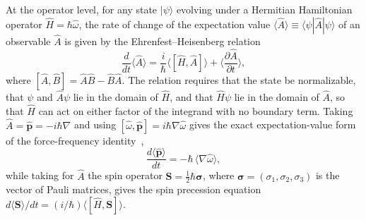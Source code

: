 \documentclass[aps,prd,onecolumn,tightenlines,nofootinbib,notitlepage,11pt,floatfix]{revtex4-2}
\theoremstyle{indentedtheorem}
\begin{document}
At the operator level, for any state $|\psi\rangle$ evolving under a Hermitian Hamiltonian operator $\hat{H} = \hbar\hat{\omega}$, the rate of change of the expectation value $\langle\hat{A}\rangle\equiv\langle\psi|\hat{A}|\psi\rangle$ of an observable $\hat{A}$ is given by the Ehrenfest--Heisenberg relation~\citep{Ehrenfest1927Bemerkung}
\begin{equation}
    \frac{d}{dt}\langle\hat{A}\rangle = \frac{i}{\hbar}\big\langle[\hat{H},\hat{A}]\big\rangle + \Big\langle\frac{\partial\hat{A}}{\partial t}\Big\rangle ,
    \label{eq:ehrenfest_commutator}
\end{equation}
where $[\hat{A},\hat{B}] = \hat{A}\hat{B} - \hat{B}\hat{A}$. The relation requires that the state be normalizable, that $\psi$ and $\hat{A}\psi$ lie in the domain of $\hat{H}$, and that $\hat{H}\psi$ lie in the domain of $\hat{A}$, so that $\hat{H}$ can act on either factor of the integrand with no boundary term. Taking $\hat{A} = \hat{\mathbf{p}} = -i\hbar\nabla$ and using $[\hat{\omega},\hat{\mathbf{p}}] = i\hbar\nabla\hat{\omega}$ gives the exact expectation-value form of the force-frequency identity~\citep{HutchisonSGM2026},
\begin{equation}
    \frac{d\langle\hat{\mathbf{p}}\rangle}{dt} = -\hbar\,\langle\nabla\hat{\omega}\rangle ,
    \label{eq:sgm_expectation}
\end{equation}
while taking for $\hat{A}$ the spin operator $\mathbf{S} = \tfrac{1}{2}\hbar\boldsymbol{\sigma}$, where $\boldsymbol{\sigma}=(\sigma_1,\sigma_2,\sigma_3)$ is the vector of Pauli matrices, gives the spin precession equation $d\langle\mathbf{S}\rangle/dt = (i/\hbar)\langle[\hat{H},\mathbf{S}]\rangle$.
\end{document}
